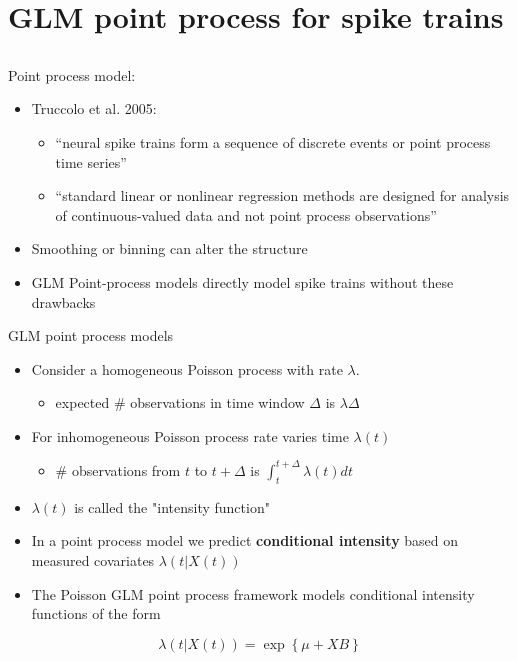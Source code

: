 \documentclass[svgnames,13pt,handout]{beamer}
\DeclareRobustCommand{\emph}[1]{\textbf{{\color{emphasizecolor} #1}}}
\begin{document}
\section{GLM point process for spike trains}


\subsection{ }

\begin{frame}{Point process model:}
\begin{itemize}
	\item Truccolo et al. 2005:
	\begin{itemize}
		\item <1->``neural spike trains form a sequence of discrete events or point process time series''
		\item <2->``standard linear or nonlinear regression methods are designed for analysis of continuous-valued data and not point process observations''
		\end{itemize}
	\item <3->Smoothing or binning can alter the structure
	\item <4->GLM Point-process models directly model spike trains without these drawbacks
\end{itemize}
\end{frame} 

\begin{frame}{GLM point process models}
\begin{itemize}
	\item <1->Consider a homogeneous Poisson process with rate $\lambda$. 
	\begin{itemize}
		\item expected \# observations in time window $\Delta$ is $\lambda\Delta$
		\end{itemize}
	\item <2->For inhomogeneous Poisson process rate varies time $\lambda(t)$
	\begin{itemize}
		\item \# observations from $t$ to $t+\Delta$ is $\int_t^{t+\Delta} \lambda(t) dt$
		\end{itemize}
	\item <3->$\lambda(t)$ is called the "intensity function"
	\item <4->In a point process model we predict \emph{conditional intensity} based on measured covariates $\lambda(t|X(t))$
	\item <5->The Poisson GLM point process framework models conditional intensity functions of the form
	\end{itemize}
\begin{overprint}
	\[\lambda(t|X(t)) = \exp \left\{ \mu + X B \right\}\]
\end{overprint}
\end{frame} 
\end{document}

